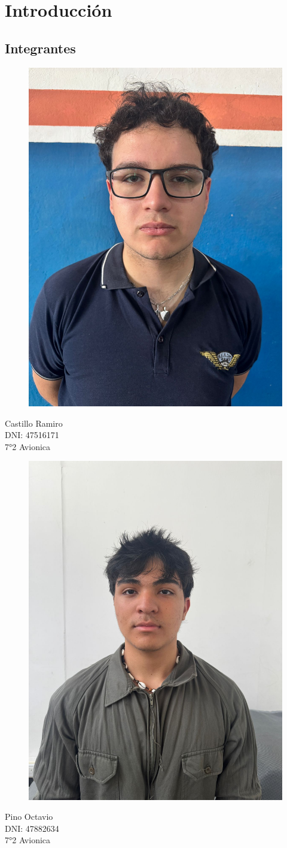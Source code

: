 \documentclass[12pt,a4paper]{article}
\begin{document}
\section{Introducción}

\subsection{Integrantes}
\begin{figure}[H]
    \centering
    \includegraphics[width=0.4\linewidth]{Carpeta tecnica/Fotoramiro.jpg}
\end{figure}
\begin{center}
Castillo Ramiro\\
DNI: 47516171\\
7°2 Avionica
\end{center}

\begin{figure}[H]
    \centering
    \includegraphics[width=0.4\linewidth]{Carpeta tecnica/fotopino.jpg}
\end{figure}
\begin{center}

Pino Octavio\\
DNI: 47882634\\
7°2 Avionica
\end{center}
\end{document}
